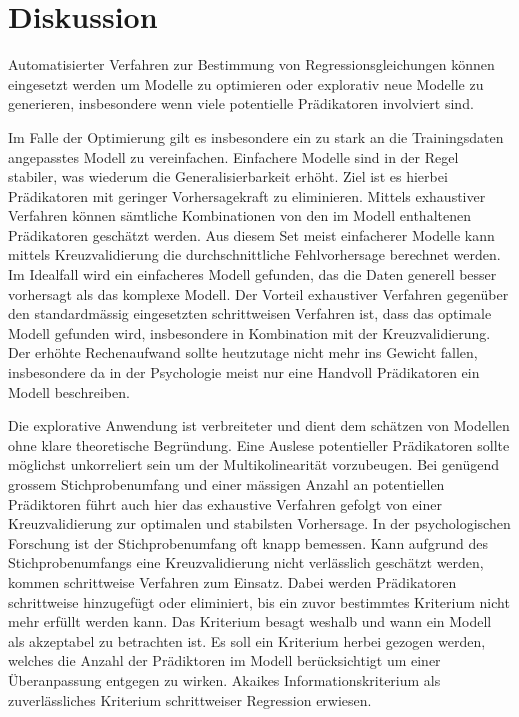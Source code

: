 \section{Diskussion}
Automatisierter Verfahren zur Bestimmung von Regressionsgleichungen können eingesetzt werden um Modelle zu optimieren oder explorativ neue Modelle zu generieren, insbesondere wenn viele potentielle Prädikatoren involviert sind. 

Im Falle der Optimierung gilt es insbesondere ein zu stark an die Trainingsdaten angepasstes Modell zu vereinfachen. 
Einfachere Modelle sind in der Regel stabiler, was wiederum die Generalisierbarkeit erhöht.
Ziel ist es hierbei Prädikatoren mit geringer Vorhersagekraft zu eliminieren. Mittels exhaustiver Verfahren können sämtliche Kombinationen von den im Modell enthaltenen Prädikatoren geschätzt werden.
Aus diesem Set meist einfacherer Modelle kann mittels Kreuzvalidierung die durchschnittliche Fehlvorhersage berechnet werden. Im Idealfall wird ein einfacheres Modell gefunden, das die Daten generell besser vorhersagt als das komplexe Modell.
Der Vorteil exhaustiver Verfahren gegenüber den standardmässig eingesetzten schrittweisen Verfahren ist, dass das optimale Modell gefunden wird, insbesondere in Kombination mit der Kreuzvalidierung.
Der erhöhte Rechenaufwand sollte heutzutage nicht mehr ins Gewicht fallen, insbesondere da in der Psychologie meist nur eine Handvoll Prädikatoren ein Modell beschreiben.  

Die explorative Anwendung ist verbreiteter und dient dem schätzen von Modellen ohne klare theoretische Begründung.
Eine Auslese potentieller Prädikatoren sollte möglichst unkorreliert sein um der Multikolinearität vorzubeugen. Bei genügend grossem Stichprobenumfang und einer mässigen Anzahl an potentiellen Prädiktoren führt auch hier das exhaustive Verfahren gefolgt von einer Kreuzvalidierung zur optimalen und stabilsten Vorhersage. In der psychologischen Forschung ist der Stichprobenumfang oft knapp bemessen. Kann aufgrund des Stichprobenumfangs eine Kreuzvalidierung nicht verlässlich geschätzt werden, kommen schrittweise Verfahren zum Einsatz. Dabei werden Prädikatoren schrittweise hinzugefügt oder eliminiert, bis ein zuvor bestimmtes Kriterium nicht mehr erfüllt werden kann. Das Kriterium  besagt weshalb und wann ein Modell als akzeptabel zu betrachten ist.
Es soll ein Kriterium herbei gezogen werden, welches die Anzahl der Prädiktoren im Modell berücksichtigt um einer Überanpassung entgegen zu wirken.
Akaikes Informationskriterium als zuverlässliches Kriterium schrittweiser Regression erwiesen.  

